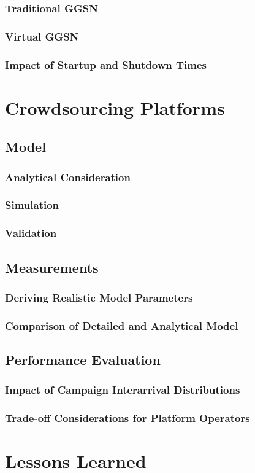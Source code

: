 \subsubsection*{Traditional GGSN}
\subsubsection*{Virtual GGSN}
\subsubsection*{Impact of Startup and Shutdown Times}

\section{Crowdsourcing Platforms}
\cite{Schwartz2015}
\subsection{Model}
\subsubsection*{Analytical Consideration}
\subsubsection*{Simulation}
\subsubsection*{Validation}
\subsection{Measurements}
\subsubsection*{Deriving Realistic Model Parameters}
\subsubsection*{Comparison of Detailed and Analytical Model}
\subsection{Performance Evaluation}
\subsubsection*{Impact of Campaign Interarrival Distributions}
\subsubsection*{Trade-off Considerations for Platform Operators}

\section{Lessons Learned}